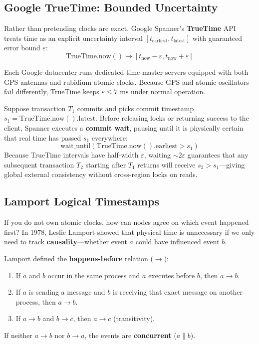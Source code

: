 \subsection{Google TrueTime: Bounded Uncertainty}

Rather than pretending clocks are exact, Google Spanner's \textbf{TrueTime} API treats time as an explicit uncertainty interval $[t_{\text{earliest}}, t_{\text{latest}}]$ with guaranteed error bound $\varepsilon$:
\begin{equation}
\text{TrueTime.now}() \to [t_{\text{now}} - \varepsilon, t_{\text{now}} + \varepsilon]
\end{equation}

Each Google datacenter runs dedicated time-master servers equipped with both GPS antennas and rubidium atomic clocks. Because GPS and atomic oscillators fail differently, TrueTime keeps $\varepsilon \le 7\text{ ms}$ under normal operation.

\begin{underthehoodbox}
Suppose transaction $T_1$ commits and picks commit timestamp $s_1 = \text{TrueTime.now}().\text{latest}$. Before releasing locks or returning success to the client, Spanner executes a \textbf{commit wait}, pausing until it is physically certain that real time has passed $s_1$ everywhere:
\begin{equation}
\text{wait\_until}(\text{TrueTime.now}().\text{earliest} > s_1)
\end{equation}
Because TrueTime intervals have half-width $\varepsilon$, waiting $\sim 2\varepsilon$ guarantees that any subsequent transaction $T_2$ starting after $T_1$ returns will receive $s_2 > s_1$---giving global external consistency without cross-region locks on reads.
\end{underthehoodbox}

\subsection{Lamport Logical Timestamps}

If you do not own atomic clocks, how can nodes agree on which event happened first? In 1978, Leslie Lamport showed that physical time is unnecessary if we only need to track \textbf{causality}---whether event $a$ could have influenced event $b$.

Lamport defined the \textbf{happens-before} relation ($\to$):
\begin{enumerate}[leftmargin=18pt]
  \item If $a$ and $b$ occur in the same process and $a$ executes before $b$, then $a \to b$.
  \item If $a$ is sending a message and $b$ is receiving that exact message on another process, then $a \to b$.
  \item If $a \to b$ and $b \to c$, then $a \to c$ (transitivity).
\end{enumerate}
If neither $a \to b$ nor $b \to a$, the events are \textbf{concurrent} ($a \parallel b$).

